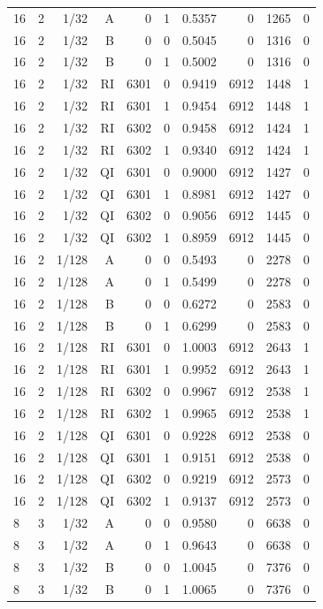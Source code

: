 \begin{longtable}{lrrrrrrrrr}
16 & 2 & 1/32 & A & 0 & 1 & 0.5357 & 0 & 1265 & 0 \\
16 & 2 & 1/32 & B & 0 & 0 & 0.5045 & 0 & 1316 & 0 \\
16 & 2 & 1/32 & B & 0 & 1 & 0.5002 & 0 & 1316 & 0 \\
16 & 2 & 1/32 & RI & 6301 & 0 & 0.9419 & 6912 & 1448 & 1 \\
16 & 2 & 1/32 & RI & 6301 & 1 & 0.9454 & 6912 & 1448 & 1 \\
16 & 2 & 1/32 & RI & 6302 & 0 & 0.9458 & 6912 & 1424 & 1 \\
16 & 2 & 1/32 & RI & 6302 & 1 & 0.9340 & 6912 & 1424 & 1 \\
16 & 2 & 1/32 & QI & 6301 & 0 & 0.9000 & 6912 & 1427 & 0 \\
16 & 2 & 1/32 & QI & 6301 & 1 & 0.8981 & 6912 & 1427 & 0 \\
16 & 2 & 1/32 & QI & 6302 & 0 & 0.9056 & 6912 & 1445 & 0 \\
16 & 2 & 1/32 & QI & 6302 & 1 & 0.8959 & 6912 & 1445 & 0 \\
16 & 2 & 1/128 & A & 0 & 0 & 0.5493 & 0 & 2278 & 0 \\
16 & 2 & 1/128 & A & 0 & 1 & 0.5499 & 0 & 2278 & 0 \\
16 & 2 & 1/128 & B & 0 & 0 & 0.6272 & 0 & 2583 & 0 \\
16 & 2 & 1/128 & B & 0 & 1 & 0.6299 & 0 & 2583 & 0 \\
16 & 2 & 1/128 & RI & 6301 & 0 & 1.0003 & 6912 & 2643 & 1 \\
16 & 2 & 1/128 & RI & 6301 & 1 & 0.9952 & 6912 & 2643 & 1 \\
16 & 2 & 1/128 & RI & 6302 & 0 & 0.9967 & 6912 & 2538 & 1 \\
16 & 2 & 1/128 & RI & 6302 & 1 & 0.9965 & 6912 & 2538 & 1 \\
16 & 2 & 1/128 & QI & 6301 & 0 & 0.9228 & 6912 & 2538 & 0 \\
16 & 2 & 1/128 & QI & 6301 & 1 & 0.9151 & 6912 & 2538 & 0 \\
16 & 2 & 1/128 & QI & 6302 & 0 & 0.9219 & 6912 & 2573 & 0 \\
16 & 2 & 1/128 & QI & 6302 & 1 & 0.9137 & 6912 & 2573 & 0 \\
8 & 3 & 1/32 & A & 0 & 0 & 0.9580 & 0 & 6638 & 0 \\
8 & 3 & 1/32 & A & 0 & 1 & 0.9643 & 0 & 6638 & 0 \\
8 & 3 & 1/32 & B & 0 & 0 & 1.0045 & 0 & 7376 & 0 \\
8 & 3 & 1/32 & B & 0 & 1 & 1.0065 & 0 & 7376 & 0 \\

\end{longtable}
